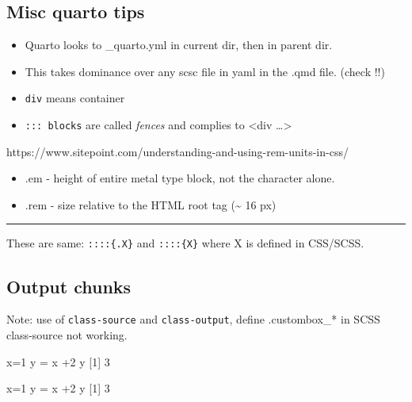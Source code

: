 \documentclass[
]{report}
\newenvironment{Shaded}{\begin{snugshade}}{\end{snugshade}}
\newcommand{\DecValTok}[1]{\textcolor[rgb]{0.68,0.00,0.00}{#1}}
\newcommand{\NormalTok}[1]{\textcolor[rgb]{0.00,0.23,0.31}{#1}}
\newcommand{\OtherTok}[1]{\textcolor[rgb]{0.00,0.23,0.31}{#1}}
\newcommand{\SpecialCharTok}[1]{\textcolor[rgb]{0.37,0.37,0.37}{#1}}
\providecommand{\tightlist}{%
  \setlength{\itemsep}{0pt}\setlength{\parskip}{0pt}}
\begin{document}
\subsection{Misc quarto tips}\label{misc-quarto-tips}

\begin{itemize}
\tightlist
\item
  Quarto looks to \_quarto.yml in current dir, then in parent dir.
\item
  This takes dominance over any scsc file in yaml in the .qmd file.
  (check !!)
\item
  \texttt{div} means container
\item
  \texttt{:::\ blocks} are called \emph{fences} and complies to
  \textless div \ldots\textgreater{}
\end{itemize}

https://www.sitepoint.com/understanding-and-using-rem-units-in-css/

\begin{itemize}
\tightlist
\item
  .em - height of entire metal type block, not the character alone.
\item
  .rem - size relative to the HTML root tag (\textasciitilde{} 16 px)
\end{itemize}

\begin{center}\rule{0.5\linewidth}{0.5pt}\end{center}

These are same: \texttt{::::\{.X\}} and \texttt{::::\{X\}} where X is
defined in CSS/SCSS.

\subsection{Output chunks}\label{output-chunks}

Note: use of \texttt{class-source} and \texttt{class-output}, define
.custombox\_* in SCSS class-source not working.

\begin{Shaded}
\begin{Highlighting}[]
\NormalTok{x}\OtherTok{=}\DecValTok{1}
\NormalTok{y }\OtherTok{=}\NormalTok{ x }\SpecialCharTok{+}\DecValTok{2}
\NormalTok{y}
\NormalTok{[}\DecValTok{1}\NormalTok{] }\DecValTok{3}
\end{Highlighting}
\end{Shaded}

\begin{Shaded}
\begin{Highlighting}[]
\NormalTok{x}\OtherTok{=}\DecValTok{1}
\NormalTok{y }\OtherTok{=}\NormalTok{ x }\SpecialCharTok{+}\DecValTok{2}
\NormalTok{y}
\NormalTok{[}\DecValTok{1}\NormalTok{] }\DecValTok{3}
\end{Highlighting}
\end{Shaded}
\end{document}
